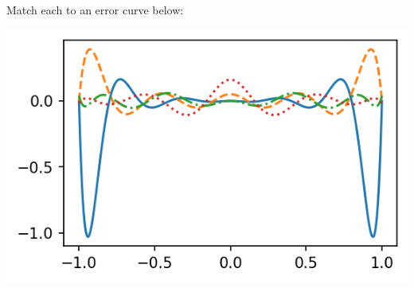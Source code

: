 \documentclass[12pt,letterpaper,noanswers]{exam}
\begin{document}
\begin{enumerate}[resume]
Match each to an error curve below:

\includegraphics{AM111-F23-CourseNotes/img/C10-gaussianerror.png}

\end{enumerate}
\end{document}
